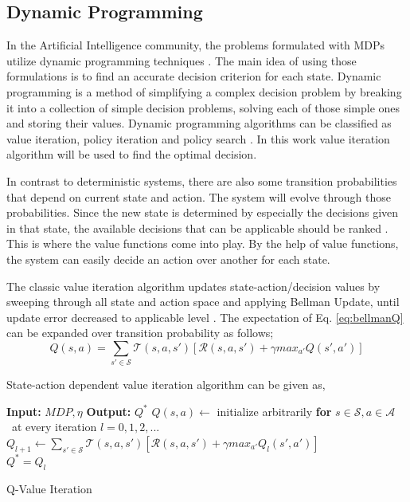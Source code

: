 \documentclass{ituphdreport}
\begin{document}
\subsection{Dynamic Programming }
In the Artificial Intelligence community, the problems formulated with MDPs utilize dynamic programming techniques \cite{sutton1984temporal}.
The main idea of using those formulations is to find an accurate decision criterion for each state. Dynamic programming is a method of simplifying a complex decision problem by breaking it into a collection of simple decision problems, solving each of those simple ones and storing their values. Dynamic programming algorithms can be classified as value iteration, policy iteration and policy search \cite{busoni:1}. In this work value iteration algorithm will be used to find the optimal decision.

In contrast to deterministic systems, there are also some transition probabilities that depend on current state and action. The system will evolve through those probabilities. Since the new state is determined by especially the decisions given in that state, the available decisions that can be applicable should be ranked \cite{bertsekas:1}. This is where the value functions come into play. By the help of value functions, the system can easily decide an action over another for each state.

The classic value iteration algorithm updates state-action/decision values by sweeping through all state and action space and applying Bellman Update, until update error decreased to applicable level \cite{bertsekas:1}. The expectation of Eq. \ref{eq:bellmanQ} can be expanded over transition probability as follows;
\begin{equation}
\label{eq:bellmanQ}
Q(s,a) = \sum_{s'\in \mathcal{S}} \mathcal{T}(s,a,s') [\mathcal{R}(s,a,s') + \gamma max_{a'} Q (s',a')]
\end{equation}

State-action dependent value iteration algorithm can be given as,

\begin{algorithm}[H]
	\begin{algorithmic}
		\Statex \textbf{Input:} $MDP, \eta $
		\Statex \textbf{Output:} $Q^*$
		\State $Q(s,a) \leftarrow $ initialize arbitrarily  \textbf{for} $s\in \mathcal{S}, a\in \mathcal{A}$
		\Repeat \ at every iteration $l = 0,1,2,...$
		\State $Q_{l+1} \leftarrow \sum_{s'\in \mathcal{S}} \mathcal{T}(s,a,s') [\mathcal{R}(s,a,s') + \gamma max_{a'} Q_l (s',a')]$
		\EndFor
		 \\
		\Return $Q^* = Q_l$
		\EndProcedure
	\end{algorithmic}
	\caption{Q-Value Iteration}
	\label{alg:value-iteration}
\end{algorithm}
\end{document}
